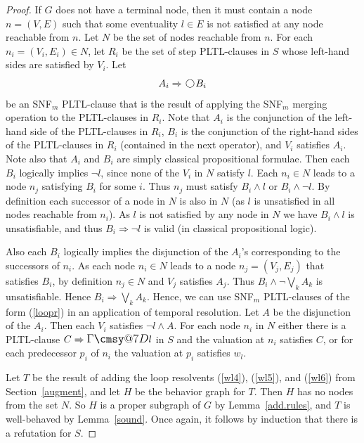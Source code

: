 \documentclass[nohyperref]{acmtrans2f}
\makeatletter
\def\sometime{\mathord{\hbox{\large$\mathchar"0\cmsy@7D$}}}
\newcommand{\next}{\!\raisebox{-.2ex}{ %
                        \mbox{\unitlength=0.9ex
                        \begin{picture}(2,2)
                        \linethickness{0.06ex}
                        \put(1,1){\circle{2}} %
                        \end{picture}}}       %
                        \,}
\let\imp=\Rightarrow
\makeatother
\begin{document}
\begin{proof}
If $G$ does not have a terminal node, then it must contain a node $n =
(V,E)$ such that some eventuality $l \in E$ is not satisfied at any
node reachable from $n$. Let $N$ be the set of nodes reachable from
$n$. For each $n_i = (V_i,E_i) \in N$, let $R_i$ be the set of step
PLTL-clauses in $S$ whose left-hand sides are satisfied by $V_i$. 
Let
%
\begin{equation}
A_i \imp \next B_i \label{loopr}
\end{equation}
%
be an SNF$_m$ PLTL-clause that is the result of applying the SNF$_m$ merging
operation to the PLTL-clauses in $R_i$.
Note that $A_i$ is the conjunction of the left-hand side of the PLTL-clauses in
$R_i$, $B_i$ is the conjunction of the right-hand sides of the PLTL-clauses in
$R_i$ (contained in the next operator), and $V_i$ satisfies $A_i$. Note
also that
$A_i$ and $B_i$ are simply  classical propositional formulae.
Then each $B_i$ logically implies
$\neg l$, since none of the $V_i$ in $N$ satisfy $l$. Each $n_i \in N$ leads to a
node $n_j$ satisfying $B_i$ for some $i$. Thus $n_j$ must satisfy $B_i
\land l$ or $B_i \land \neg l$. By definition each successor of a node in
$N$ is also in $N$ (as $l$ is unsatisfied in all nodes reachable from
$n_i$). As $l$ is not satisfied by any node in $N$ we have $B_i \land l$ is
unsatisfiable, and thus $B_i \imp \neg l$ is valid (in classical
propositional logic).

Also each $B_i$ logically
implies the disjunction of the $A_i$'s corresponding to the successors
of $n_i$. 
As each node $n_i \in N$
leads to a node $n_j =(V_j,E_j)$ that satisfies $B_i$, by definition $n_j
\in N$ and $V_j$ satisfies $A_j$. Thus $B_i \land \neg \bigvee_k A_k$ is
unsatisfiable. Hence $B_i \imp \bigvee_k A_k$.
Hence, we can use SNF$_m$ PLTL-clauses of the form (\ref{loopr}) in an
application of temporal resolution. Let $A$ be the disjunction of the
$A_i$. Then each $V_i$ satisfies $\neg l \land A$. For each node $n_i$
in $N$ either there is a PLTL-clause $C \imp \sometime l$ in $S$ and the
valuation at $n_i$ satisfies $C$, or for each predecessor $p_i$ of
$n_i$ the valuation at $p_i$ satisfies $w_l$.

Let $T$ be the result of adding the loop resolvents (\ref{wl4}), (\ref{wl5}), and
(\ref{wl6}) from Section~\ref{augment}, and let $H$ be the behavior graph for
$T$. Then $H$ has no nodes from the set $N$. So $H$ is a proper
subgraph of $G$ by Lemma~\ref{add.rules}, and $T$ is well-behaved by
Lemma~\ref{sound}. Once again, it follows by induction that
there is a refutation for $S$.
%
\end{proof}
\end{document}
